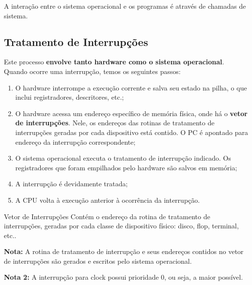 A interação entre o sistema operacional e os programas é através de chamadas de sistema.



\subsection{Tratamento de Interrupções}

Este processo \textbf{envolve tanto hardware como o sistema operacional}. Quando ocorre uma interrupção, temos os seguintes passos:
\begin{enumerate}
  \item O hardware interrompe a execução corrente e salva seu estado na pilha, o que inclui registradores, descritores, etc.;

  \item O hardware acessa um endereço específico de memória física, onde há o \textbf{vetor de interrupções}. Nele, os endereços das rotinas de tratamento de interrupções geradas por cada dispositivo está contido. O PC é apontado para endereço da interrupção correspondente;

  \item O sistema operacional executa o tratamento de interrupção indicado. Os registradores que foram empilhados pelo hardware são salvos em memória;

  \item A interrupção é devidamente tratada;

  \item A CPU volta à execução anterior à ocorrência da interrupção.
\end{enumerate}

\begin{definicao}{Vetor de Interrupções}
  Contém o endereço da rotina de tratamento de interrupções, geradas por cada classe de dispositivo físico: disco, flop, terminal, etc..
\end{definicao}


\textbf{Nota:} A rotina de tratamento de interrupção e seus endereços contidos no vetor de interrupções são gerados e escritos pelo sistema operacional.

\textbf{Nota 2:} A interrupção para clock possui prioridade 0, ou seja, a maior possível.



















